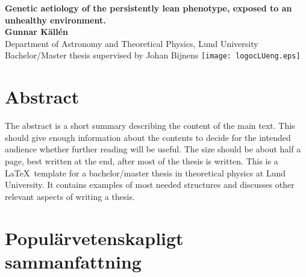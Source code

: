 \documentclass[a4paper,12pt]{article}
\begin{document}
\begin{titlepage}
\vfill
\begin{center}
{\large\bf Genetic aetiology of the persistently lean phenotype, exposed to an unhealthy environment.}
\\[3cm]
{\bf Gunnar Käll\'en}
\\[5mm]
{Department of Astronomy and Theoretical Physics, Lund University}
\\[2cm]
{Bachelor/Master thesis supervised by Johan Bijnens}
\vfill
\texttt{[image: logocLUeng.eps]}
\end{center}
\end{titlepage}
\thispagestyle{empty} %

\phantom{p}
\vfill

\section*{Abstract}
The abstract is a short summary describing the content of the main text.
This should give enough information about the contents to decide for the
intended audience whether further reading will be useful. The size should
be about half a page, best written at the end, after most of the thesis is
written.
This is a \LaTeX\ template for a bachelor/master thesis in theoretical physics
at Lund University. It contains examples of most needed structures
and discusses other relevant aspects of writing a thesis.

\vfill

\section*{Populärvetenskapligt sammanfattning}
\end{document}

